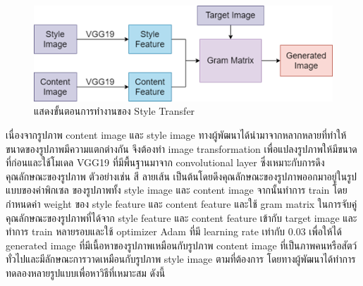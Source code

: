 \documentclass[12pt,oneside,openright,a4paper]{cpe-thai-project}
\begin{document}
\begin{figure}[!h]
  \centering
  \includegraphics[width=15cm]{./image/styleTransfer.png}
  \caption{แสดงขั้นตอนการทำงานของ Style Transfer}
  \label{fig:styleTransfer}
\end{figure}

\par\setlength{\parindent}{5ex}
เนื่องจากรูปภาพ content image และ style image ทางผู้พัฒนาได้นำมาจากหลากหลายที่ทำให้ขนาดของรูปภาพมีความแตกต่างกัน จึงต้องทำ image transformation เพื่อแปลงรูปภาพให้มีขนาดที่ก่อนและใช้โมเดล VGG19 ที่มีพื้นฐานมาจาก convolutional layer ซึ่งเหมาะกับการดึงคุณลักษณะของรูปภาพ ตัวอย่างเช่น สี ลายเส้น เป็นต้นโดยดึงคุณลักษณะของรูปภาพออกมาอยู่ในรูปแบบของค่าพิกเซล ของรูปภาพทั้ง style image และ content image จากนั้นทำการ train โดยกำหนดค่า weight ของ style feature และ content feature และใช้ gram matrix ในการจับคู่คุณลักษณะของรูปภาพที่ได้จาก style feature และ content feature เข้ากับ target image และทำการ train หลายรอบและใช้ optimizer Adam ที่มี learning rate เท่ากับ 0.03 เพื่อให้ได้ generated image ที่มีเนื้อหาของรูปภาพเหมือนกับรูปภาพ content image ที่เป็นภาพคนหรือสัตว์ทั่วไปและมีลักษณะการวาดเหมือนกับรูปภาพ style image ตามที่ต้องการ โดยทางผู้พัฒนาได้ทำการทดลองหลายรูปแบบเพื่อหาวิธีที่เหมาะสม ดังนี้
\end{document}
